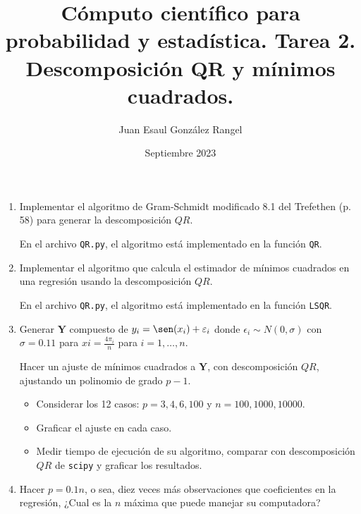 \documentclass{article}
\title{Cómputo científico para probabilidad y estadística. Tarea 2.\\
Descomposición QR y mínimos cuadrados.}
\author{Juan Esaul González Rangel}
\date{Septiembre 2023}
\begin{document}
\maketitle


\begin{enumerate}

    \item Implementar el algoritmo de Gram-Schmidt modificado 8.1 del Trefethen (p. 58) para generar la descomposición $QR$.

    En el archivo \texttt{QR.py}, el algoritmo está implementado en la función \texttt{QR}. 

    \item Implementar el algoritmo que calcula el estimador de mínimos cuadrados
    en una regresión usando la descomposición $QR$.

    En el archivo \texttt{QR.py}, el algoritmo está implementado en la función \texttt{LSQR}. 

    \item Generar $\mathbf Y$ compuesto de $y_i = \sen(x_i) + \epsilon_i$ donde $\epsilon_i \sim N (0, \sigma)$ con $\sigma = 0.11$ para $xi = \frac{4\pi_i}n$ para $i = 1, \dots , n$.

    Hacer un ajuste de mínimos cuadrados a $\mathbf Y$, con descomposición $QR$, ajustando un polinomio de grado $p - 1$.

    \begin{itemize}
        \item Considerar los 12 casos: $p = 3, 4, 6, 100$ y $n = 100, 1000, 10000$.
        \item Graficar el ajuste en cada caso.
        \item Medir tiempo de ejecución de su algoritmo, comparar con descomposición $QR$ de \texttt{scipy} y graficar los resultados.
    \end{itemize}


    \item Hacer $p = 0.1n$, o sea, diez veces más observaciones que coeficientes en la regresión, ¿Cual es la $n$ máxima que puede manejar su computadora?
   
\end{enumerate}




 
\end{document}
